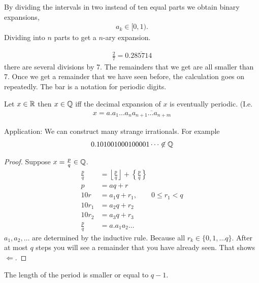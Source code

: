 \begin{rk}
	By dividing the intervals in two instead of ten equal parts we obtain binary expansions,
	\begin{align*}
	a_k \in [0,1).
	\end{align*}
	Dividing into $n$ parts to get a $n$-ary expansion.
\end{rk}

\begin{ex}
	\begin{align*}
	\frac 2 7 = 0.\overline{285714} %
	\end{align*}
	there are several divisions by 7. The remainders that we get are all smaller than 7. Once we get a remainder that we have seen before, the calculation goes on repeatedly. The bar is a notation for periodic digits.
\end{ex}

\begin{tm}
	Let $x \in \mathbb R$ then $x \in \mathbb Q$ iff the decimal expansion of $x$ is eventually periodic. (I.e.
	\begin{align*}
	x = a. a_1 \dots a_n \overline{a_{n+1} \dots a_{n+m}}
	\end{align*}
\end{tm}

Application: We can construct many strange irrationals. For example
\begin{align*}
0.101001000100001\dots \not\in \mathbb Q
\end{align*}

\begin{proof}
	Suppose $x = \frac p q \in \mathbb Q$. 
	\begin{align*}
	\frac p q & = \left\lfloor \frac p q \right\rfloor + \left\{ \frac p q \right\} \\
	p & = aq + r \\
	10r & = a_1 q + r_1, \qquad 0 \le r_1 < q \\
	10 r_1 & = a_2 q + r_2 \\
	10r_2 & = a_3 q + r_3 \\
	\frac p q & = a. a_1 a_2 \dots
	\end{align*}
	$a_1, a_2, \dots$ are determined by the inductive rule. Because all $r_k \in \{0,1, \dots q \}$. After at most $q$ steps you will see a remainder that you have already seen. That shows $\Leftarrow$.
\end{proof}

\begin{rk}
The length of the period is smaller or equal to $q-1$.
\end{rk}

